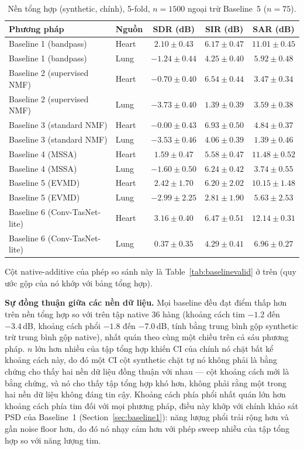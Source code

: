 \documentclass[11pt]{article}
\begin{document}
\begin{table}[H]
\centering
\caption{Nền tổng hợp (synthetic, chính), 5-fold, $n{=}1500$ ngoại trừ Baseline~5 ($n{=}75$).}
\label{tab:sixmethodsynth}
\begin{tabular}{@{}llccc@{}}
\toprule
Phương pháp & Nguồn & SDR (dB) & SIR (dB) & SAR (dB) \\
\midrule
Baseline 1 (bandpass) & Heart & $2.10 \pm 0.43$ & $6.17 \pm 0.47$ & $11.01 \pm 0.45$ \\
Baseline 1 (bandpass) & Lung  & $-1.24 \pm 0.44$ & $4.25 \pm 0.40$ & $5.92 \pm 0.48$ \\
\addlinespace
Baseline 2 (supervised NMF) & Heart & $-0.70 \pm 0.40$ & $6.54 \pm 0.44$ & $3.47 \pm 0.34$ \\
Baseline 2 (supervised NMF) & Lung  & $-3.73 \pm 0.40$ & $1.39 \pm 0.39$ & $3.59 \pm 0.38$ \\
\addlinespace
Baseline 3 (standard NMF) & Heart & $-0.00 \pm 0.43$ & $6.93 \pm 0.50$ & $4.84 \pm 0.37$ \\
Baseline 3 (standard NMF) & Lung  & $-3.53 \pm 0.46$ & $4.06 \pm 0.39$ & $1.39 \pm 0.46$ \\
\addlinespace
Baseline 4 (MSSA) & Heart & $1.59 \pm 0.47$ & $5.58 \pm 0.47$ & $11.48 \pm 0.52$ \\
Baseline 4 (MSSA) & Lung  & $-1.60 \pm 0.50$ & $6.24 \pm 0.42$ & $3.74 \pm 0.55$ \\
\addlinespace
Baseline 5 (EVMD) & Heart & $2.42 \pm 1.70$ & $6.20 \pm 2.02$ & $10.15 \pm 1.48$ \\
Baseline 5 (EVMD) & Lung  & $-2.99 \pm 2.25$ & $2.81 \pm 1.90$ & $5.63 \pm 2.53$ \\
\addlinespace
Baseline 6 (Conv-TasNet-lite) & Heart & $3.16 \pm 0.40$ & $6.47 \pm 0.51$ & $12.14 \pm 0.31$ \\
Baseline 6 (Conv-TasNet-lite) & Lung  & $0.37 \pm 0.35$ & $4.29 \pm 0.41$ & $6.96 \pm 0.27$ \\
\bottomrule
\end{tabular}
\end{table}

Cột native-additive của phép so sánh này là Table~\ref{tab:baselinevalid}
ở trên (quy ước gộp của nó khớp với bảng tổng hợp).

\textbf{Sự đồng thuận giữa các nền dữ liệu.} Mọi baseline đều đạt điểm
thấp hơn trên nền tổng hợp so với trên tập native 36 hàng (khoảng cách
tim $-1.2$ đến $-3.4$\,dB, khoảng cách phổi $-1.8$ đến $-7.0$\,dB, tính
bằng trung bình gộp synthetic trừ trung bình gộp native), nhất quán theo cùng
một chiều trên cả sáu phương pháp. $n$ lớn hơn nhiều của tập tổng hợp
khiến CI của chính nó chặt bất kể khoảng cách này, do đó một CI cột
synthetic chặt tự nó không phải là bằng chứng cho thấy hai nền dữ liệu
đồng thuận với nhau --- cột khoảng cách mới là bằng chứng, và nó cho
thấy tập tổng hợp khó hơn, không phải rằng một trong hai nền dữ liệu
không đáng tin cậy. Khoảng cách phía phổi nhất quán lớn hơn khoảng cách
phía tim đối với mọi phương pháp, điều này khớp với chính khảo sát PSD
của Baseline~1 (Section~\ref{sec:baseline1}): năng lượng phổi trải rộng
hơn và gần noise floor hơn, do đó nó nhạy cảm hơn với phép sweep nhiễu
của tập tổng hợp so với năng lượng tim.
\end{document}
